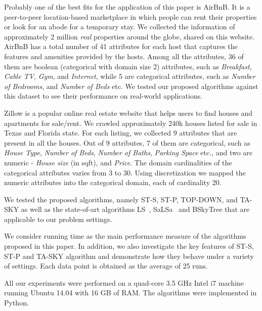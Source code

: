 \vspace{1mm}
 Probably one of the best fits for the application of this paper is AirBnB. It is a peer-to-peer location-based marketplace in which people can rent their properties or look for an abode for a temporary stay. We collected the information of approximately 2 million \emph{real} properties around the globe, shared on this website. AirBnB has a total number of 41 attributes for each host that captures the features and amenities provided by the hosts. Among all the attributes, 36 of them are boolean (categorical with domain size 2) attributes, such as \emph{Breakfast}, \emph{Cable TV}, \emph{Gym}, and \emph{Internet}, while 5 are categorical attributes, such as \emph{Number of Bedrooms}, and \emph{Number of Beds} etc. We tested our proposed algorithms against this dataset to see their performance on real-world applications.


\vspace{1mm}
Zillow is a popular online real estate website that helps users to find houses and apartments for sale/rent. We crawled approximately 240k houses listed for sale in Texas and Florida state. For each listing, we collected 9 attributes that are present in all the houses. Out of 9 attributes, 7 of them are categorical, such as \emph{House Type}, \emph{Number of Beds}, \emph{Number of Baths}, \emph{Parking Space} etc., and two are numeric - \emph{House size} (in sqft), and \emph{Price}. The domain cardinalities of the categorical attributes varies from 3 to 30. Using discretization we mapped the numeric attributes into the categorical domain, each of cardinality 20. 


\vspace{1mm}
We tested the proposed algorithms, namely ST-S, ST-P, TOP-DOWN, and TA-SKY as well as the state-of-art algorithms LS~\cite{morse2007efficient}, SaLSa~\cite{bartolini2008efficient} and BSkyTree \cite{lee2014scalable} that are applicable to our problem settings. 


\vspace{1mm}
 We consider running time as the main performance measure of the algorithms proposed in this paper. In addition, we also investigate the key features of ST-S, ST-P and TA-SKY algorithm and demonstrate how they behave under a variety of settings. Each data point is obtained as the average of 25 runs.


\vspace{1mm}
 All our experiments were performed on a quad-core 3.5 GHz Intel i7 machine running Ubuntu 14.04 with 16 GB of RAM. The algorithms were implemented in Python.




